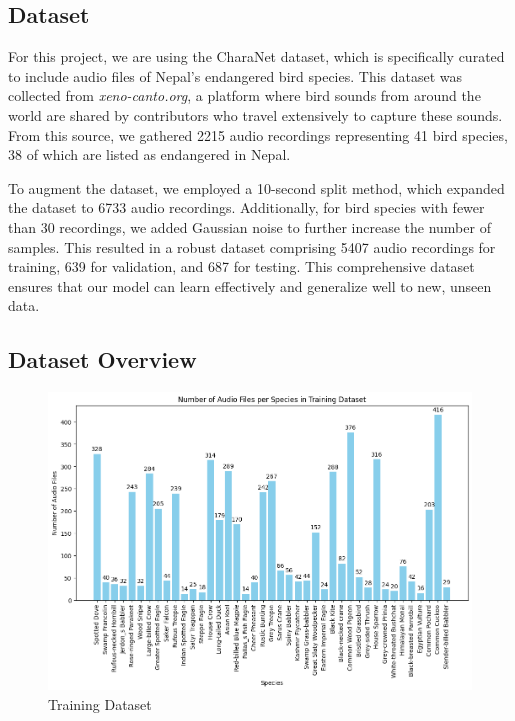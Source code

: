 \subsection{Dataset}

For this project, we are using the CharaNet dataset, which is specifically curated to include audio files of Nepal's endangered bird species. This dataset was collected from \textit{xeno-canto.org}, a platform where bird sounds from around the world are shared by contributors who travel extensively to capture these sounds. From this source, we gathered 2215 audio recordings representing 41 bird species, 38 of which are listed as endangered in Nepal.

To augment the dataset, we employed a 10-second split method, which expanded the dataset to 6733 audio recordings. Additionally, for bird species with fewer than 30 recordings, we added Gaussian noise to further increase the number of samples. This resulted in a robust dataset comprising 5407 audio recordings for training, 639 for validation, and 687 for testing. This comprehensive dataset ensures that our model can learn effectively and generalize well to new, unseen data.
\newpage
\subsection{Dataset Overview}
\begin{figure}[h!]
    \centering
    \includegraphics[scale=0.4]{images/TrainingDataset.png}
    \caption{Training Dataset}
\end{figure}


